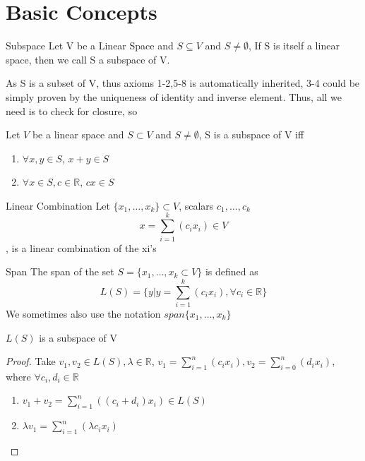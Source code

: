 \section{Basic Concepts}
\begin{definition}{Subspace}
  Let V be a Linear Space and $S \subseteq V$ and $S \neq \emptyset$, 
  If S is itself a linear space, then we call S a subspace of V.

\end{definition}
As S is a subset of V, thus axioms 1-2,5-8 is automatically inherited, 3-4 could be simply proven by the uniqueness of identity and inverse element.
Thus, all we need is to check for closure, so

\begin{theorem}
  Let $V$ be a linear space and $S \subset V$ and $S \neq \emptyset$, S is a subspace of V iff 
  \begin{enumerate}
    \item $\forall x,y \in S$, $x+y \in S$
    \item $\forall x \in S, c \in \mathbb{R}$, $cx \in S$
  \end{enumerate} 
\end{theorem}
\begin{definition}{Linear Combination}
  Let $\{x_{1},\dots,x_{k}\} \subset V$, scalars $c_{1},\dots,c_{k}$
  \[x = \sum_{i=1}^{k}(c_{i}x_{i})\in V\], is a linear combination of the xi's

\end{definition}
\begin{definition}{Span}
  The span of the set $S = \{x_{1},\dots,x_{k} \subset V\}$ is defined as
  \[L(S) = \{y|y = \sum_{i=1}^{k}(c_{i}x_{i}),\forall c_{i} \in \mathbb{R} \}\]
  We sometimes also use the notation $span\{x_{1},\dots,x_{k}\}$
\end{definition}
\begin{property}
  $L(S)$ is a subspace of V
\end{property}
\begin{proof}
  Take $v_{1},v_{2}\in L(S), \lambda \in \mathbb{R}$, $v_{1} = \sum_{i=1}^{n}(c_{i}x_{i}),v_{2} = \sum_{i=0}^{n}(d_{i}x_{i})$, where $\forall c_{i},d_{i} \in \mathbb{R}$
  \begin{enumerate}
    \item $v_{1}+v_{2} = \sum_{i = 1}^{n}((c_{i}+d_{i})x_{i})\in L(S)$
    \item $\lambda v_{1} = \sum_{i=1}^{n}(\lambda c_{i}x_{i})$\qedhere
  \end{enumerate}
\end{proof}
